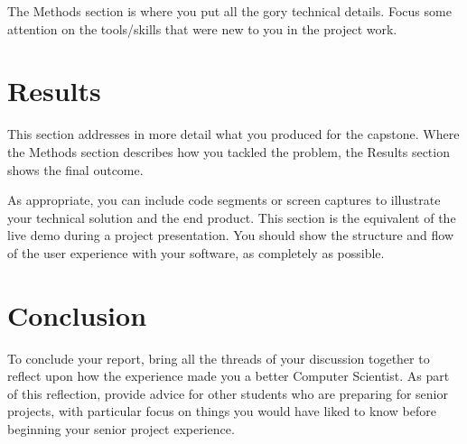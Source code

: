 \documentclass[titlepage]{article}
\begin{document}
The Methods section is where you put all the gory technical details. Focus some attention on the tools/skills that were new to you in the project work.

\section{Results}
This section addresses in more detail what you produced for the capstone. Where the Methods section describes how you tackled the problem, the Results section shows the final outcome. 

As appropriate, you can include code segments or screen captures to illustrate your technical solution and the end product. This section is the equivalent of the live demo during a project presentation. You should show the structure and flow of the user experience with your software, as completely as possible.
 
\section{Conclusion} 
To conclude your report, bring all the threads of your discussion together to reflect upon how the experience made you a better Computer Scientist. As part of this reflection, provide advice for other students who are preparing for senior projects, with particular focus on things you would have liked to know before beginning your senior project experience.
 	


\end{document}
